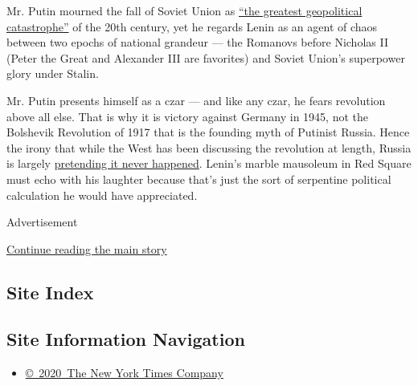 Mr. Putin mourned the fall of Soviet Union as
\href{http://www.nbcnews.com/id/7632057/ns/world_news/t/putin-soviet-collapse-genuine-tragedy/\#.WfzGyBNSxmM}{``the
greatest geopolitical catastrophe''} of the 20th century, yet he regards
Lenin as an agent of chaos between two epochs of national grandeur ---
the Romanovs before Nicholas II (Peter the Great and Alexander III are
favorites) and Soviet Union's superpower glory under Stalin.

Mr. Putin presents himself as a czar --- and like any czar, he fears
revolution above all else. That is why it is victory against Germany in
1945, not the Bolshevik Revolution of 1917 that is the founding myth of
Putinist Russia. Hence the irony that while the West has been discussing
the revolution at length, Russia is largely
\href{https://www.theatlantic.com/international/archive/2017/04/russia-putin-revolution-lenin-nicholas-1917/521571/}{pretending
it never happened}. Lenin's marble mausoleum in Red Square must echo
with his laughter because that's just the sort of serpentine political
calculation he would have appreciated.

Advertisement

\protect\hyperlink{after-bottom}{Continue reading the main story}

\hypertarget{site-index}{%
\subsection{Site Index}\label{site-index}}

\hypertarget{site-information-navigation}{%
\subsection{Site Information
Navigation}\label{site-information-navigation}}

\begin{itemize}
\tightlist
\item
  \href{https://help.nytimes.com/hc/en-us/articles/115014792127-Copyright-notice}{©~2020~The
  New York Times Company}
\end{itemize}

